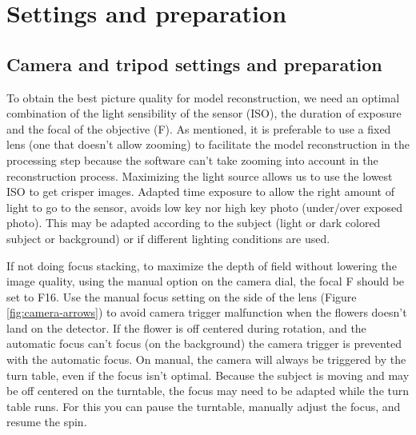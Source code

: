 \documentclass[
]{book}
\begin{document}
\hypertarget{settings-and-preparation}{%
\chapter{Settings and preparation}\label{settings-and-preparation}}

\hypertarget{camera-and-tripod-settings-and-preparation}{%
\section{Camera and tripod settings and preparation}\label{camera-and-tripod-settings-and-preparation}}

To obtain the best picture quality for model reconstruction, we need an optimal combination of the light sensibility of the sensor (ISO), the duration of exposure and the focal of the objective (F). As mentioned, it is preferable to use a fixed lens (one that doesn't allow zooming) to facilitate the model reconstruction in the processing step because the software can't take zooming into account in the reconstruction process. Maximizing the light source allows us to use the lowest ISO to get crisper images. Adapted time exposure to allow the right amount of light to go to the sensor, avoids low key nor high key photo (under/over exposed photo). This may be adapted according to the subject (light or dark colored subject or background) or if different lighting conditions are used.

If not doing focus stacking, to maximize the depth of field without lowering the image quality, using the manual option on the camera dial, the focal F should be set to F16. Use the manual focus setting on the side of the lens (Figure \ref{fig:camera-arrows}) to avoid camera trigger malfunction when the flowers doesn't land on the detector. If the flower is off centered during rotation, and the automatic focus can't focus (on the background) the camera trigger is prevented with the automatic focus. On manual, the camera will always be triggered by the turn table, even if the focus isn't optimal. Because the subject is moving and may be off centered on the turntable, the focus may need to be adapted while the turn table runs. For this you can pause the turntable, manually adjust the focus, and resume the spin.
\end{document}
